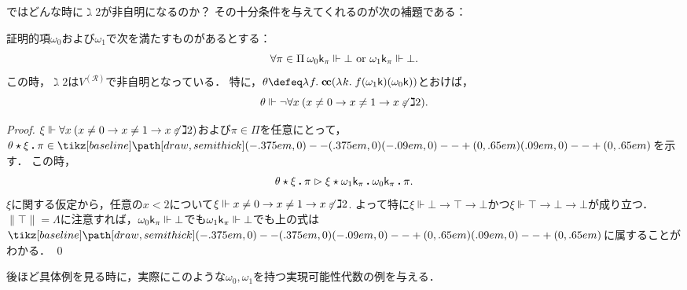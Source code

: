 \documentclass[realisability.tex]{subfiles}
\begin{document}
ではどんな時に$\gimel 2$が非自明になるのか？
その十分条件を与えてくれるのが次の補題である：

\begin{lemma}\label{lem:char-ba-nontriv}
 証明的項$\omega_0$および$\omega_1$で次を満たすものがあるとする：
 \[
  \forall \pi \in \Pi \: \omega_0 \mathsf{k}_\pi \Vdash \bot \text{ or } \omega_1 \mathsf{k}_\pi \Vdash \bot.
 \]
 この時，$\gimel 2$は$V^{(\mathcal{R})}$で非自明となっている．
 特に，$\theta \defeq \abs{f}{\cc (\abs{k}{f(\omega_1 \conti)(\omega_0 \conti)})}$とおけば，
 \[
  \theta \Vdash \neg \forall x \: (x \neq 0 \to x \neq 1 \to x \not\mathrel{\varepsilon} \gimel 2).
 \]
\end{lemma}
\begin{proof}
 $\xi \Vdash \forall x \: (x \neq 0 \to x \neq 1 \to x \not\mathrel{\varepsilon} \gimel 2)$および$\pi \in \Pi$を任意にとって，$\theta \cons \xi \push \pi\in \pole$を示す．
 この時，
 \[
  {\theta \mathbin{\star} \xi \mathbin{\boldsymbol{.}} \pi}
  \mathrel{\rhd} {\xi \mathbin{\star} {\omega_1 \mathsf{k}_{\pi}} \mathbin{\boldsymbol{.}} {\omega_0 \mathsf{k}_{\pi}} \mathbin{\boldsymbol{.}} \pi}.
 \]
 $\xi$に関する仮定から，任意の$x < 2$について$\xi \Vdash x \neq 0 \to x \neq 1 \to x \not\mathrel{\varepsilon} \gimel 2$.
 よって特に$\xi \Vdash \bot \to \top \to \bot$かつ$\xi \Vdash \top \to \bot \to \bot$が成り立つ．
 $\|\top\| = \Lambda$に注意すれば，$\omega_0 \mathsf{k}_\pi \Vdash \bot$でも$\omega_1 \mathsf{k}_\pi \Vdash \bot$でも上の式は$\pole$に属することがわかる． \qed
\end{proof}
後ほど具体例を見る時に，実際にこのような$\omega_0, \omega_1$を持つ実現可能性代数の例を与える．
\end{document}
